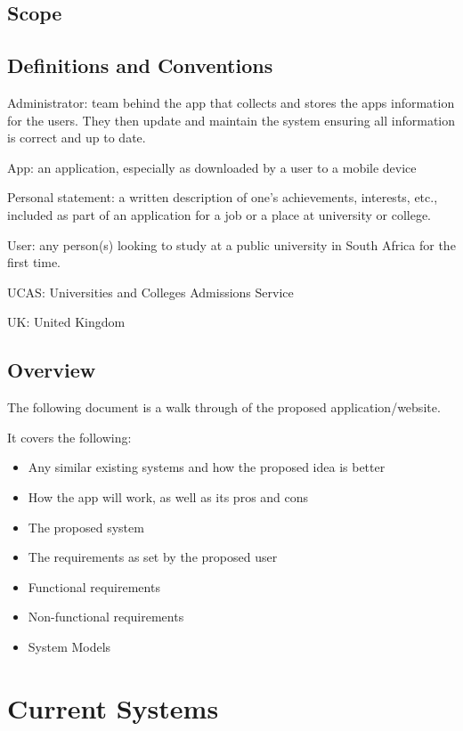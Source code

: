 \documentclass[a4paper, 12pt]{article}
\begin{document}
\subsection{Scope} 


\subsection{Definitions and Conventions}

Administrator: team behind the app that collects and stores the apps information for the users. They then update and maintain the system ensuring all information is correct and up to date.

App: an application, especially as downloaded by a user to a mobile device

Personal statement: a written description of one's achievements, interests, etc., included as part of an application for a job or a place at university or college.

User: any person(s) looking to study at a public university in South Africa for the first time.

UCAS: Universities and Colleges Admissions Service

UK: United Kingdom 


\subsection{Overview}

The following document is a walk through of the proposed application/website.

It covers the following:
\begin{itemize}
\item Any similar existing systems and how the proposed idea is better 
\item How the app will work, as well as its pros and cons
\item The proposed system
\item The requirements as set by the proposed user 
\item Functional requirements 
\item Non-functional requirements 
\item System Models
\end{itemize}

\newpage
\section{Current Systems}
\end{document}
